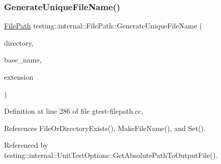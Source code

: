 \subsubsection{\texorpdfstring{Generate\+Unique\+File\+Name()}{GenerateUniqueFileName()}}
{\footnotesize\ttfamily \hyperlink{classtesting_1_1internal_1_1FilePath}{File\+Path} testing\+::internal\+::\+File\+Path\+::\+Generate\+Unique\+File\+Name (\begin{DoxyParamCaption}\item[{const \hyperlink{classtesting_1_1internal_1_1FilePath}{File\+Path} \&}]{directory,  }\item[{const \hyperlink{classtesting_1_1internal_1_1FilePath}{File\+Path} \&}]{base\+\_\+name,  }\item[{const char $\ast$}]{extension }\end{DoxyParamCaption})\hspace{0.3cm}{\ttfamily [static]}}



Definition at line 286 of file gtest-\/filepath.\+cc.



References File\+Or\+Directory\+Exists(), Make\+File\+Name(), and Set().



Referenced by testing\+::internal\+::\+Unit\+Test\+Options\+::\+Get\+Absolute\+Path\+To\+Output\+File().


